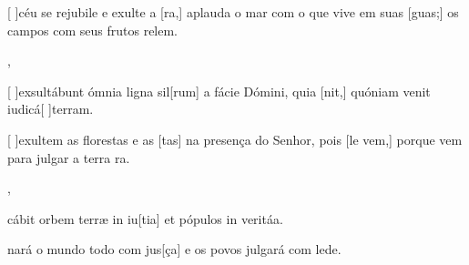 {    {\item {}[ ]{céu} se rejubile e exulte a [ra,] aplauda o mar com o que vive em suas [guas;] os campos com seus frutos relem.},
  {\item {}[ ]{ex}sultábunt ómnia ligna sil[rum] a fácie Dómini, quia [nit,] quóniam venit iudicá[ ]{ter}ram.}%
    {\item {}[ ]{e}xultem as florestas e as [tas] na presença do Senhor, pois [le vem,] porque vem para julgar a terra ra.},
  {\item {}cábit orbem terræ in iu[tia] et pópulos in veritáa.}%
    {\item {}nará o mundo todo com jus[ça] e os povos julgará com lede.}
}